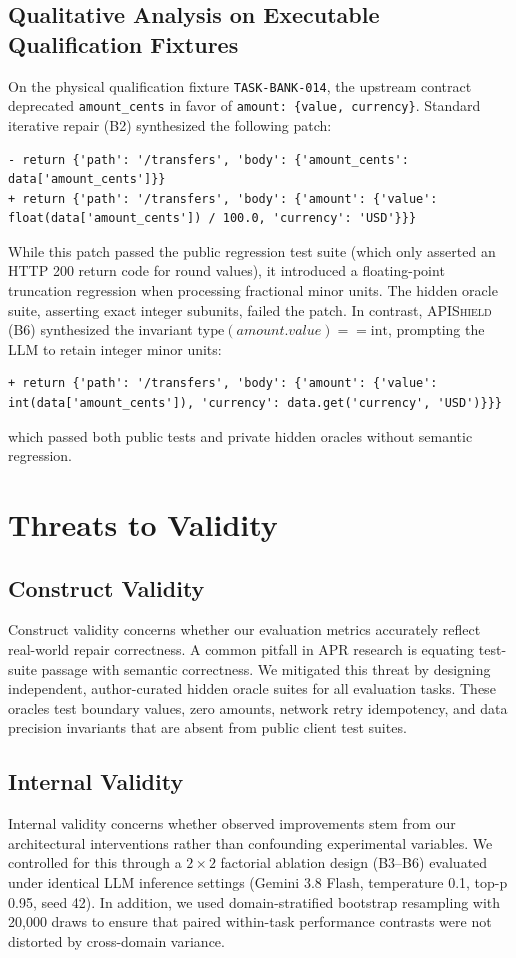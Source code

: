 \subsection{Qualitative Analysis on Executable Qualification Fixtures}
On the physical qualification fixture \texttt{TASK-BANK-014}, the upstream contract deprecated \texttt{amount\_cents} in favor of \texttt{amount: \{value, currency\}}. Standard iterative repair (B2) synthesized the following patch:
\begin{verbatim}
- return {'path': '/transfers', 'body': {'amount_cents': data['amount_cents']}}
+ return {'path': '/transfers', 'body': {'amount': {'value': float(data['amount_cents']) / 100.0, 'currency': 'USD'}}}
\end{verbatim}
While this patch passed the public regression test suite (which only asserted an HTTP 200 return code for round values), it introduced a floating-point truncation regression when processing fractional minor units. The hidden oracle suite, asserting exact integer subunits, failed the patch. In contrast, \textsc{APIShield} (B6) synthesized the invariant $\text{type}(amount.value) == \text{int}$, prompting the LLM to retain integer minor units:
\begin{verbatim}
+ return {'path': '/transfers', 'body': {'amount': {'value': int(data['amount_cents']), 'currency': data.get('currency', 'USD')}}}
\end{verbatim}
which passed both public tests and private hidden oracles without semantic regression.

\section{Threats to Validity}
\label{sec:threats}

\subsection{Construct Validity}
Construct validity concerns whether our evaluation metrics accurately reflect real-world repair correctness. A common pitfall in APR research is equating test-suite passage with semantic correctness. We mitigated this threat by designing independent, author-curated hidden oracle suites for all evaluation tasks. These oracles test boundary values, zero amounts, network retry idempotency, and data precision invariants that are absent from public client test suites.

\subsection{Internal Validity}
Internal validity concerns whether observed improvements stem from our architectural interventions rather than confounding experimental variables. We controlled for this through a $2 \times 2$ factorial ablation design (B3--B6) evaluated under identical LLM inference settings (Gemini 3.8 Flash, temperature 0.1, top-p 0.95, seed 42). In addition, we used domain-stratified bootstrap resampling with 20,000 draws to ensure that paired within-task performance contrasts were not distorted by cross-domain variance.


